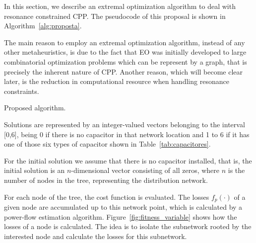 \documentclass[11pt]{article}
\begin{document}
In this section, we describe an extremal optimization algorithm to deal 
with resonance constrained CPP. The pseudocode of this proposal is shown in 
Algorithm~\ref{alg:proposta}.

The main reason to employ an extremal optimization algorithm, instead of any 
other metaheuristics, is due to the fact that EO was initially developed
to large combinatorial optimization problems which can be represent by a graph,
that is precisely the inherent nature of CPP. Another reason, which will become clear later, 
is the reduction in computational resource when handling resonance constraints. 

\begin{algorithm}
        \caption{Proposed algorithm.}
        \label{alg:proposta}
\end{algorithm}

Solutions are represented by an integer-valued vectors belonging to the interval [0,6], 
being 0 if there is no capacitor in that network location and 1 to 6 if it has one
of those six types of capacitor shown in Table~\ref{tab:capacitores}.

For the initial solution we assume that there is no capacitor installed, that is, the initial 
solution is an $n$-dimensional vector consisting of all zeros, where $n$ is the number of nodes in 
the tree, representing the distribution network.

For each node of the tree, the cost function is evaluated. The losses $f_p(\cdot)$ of a given 
node are accumulated up to this network point, which is calculated by a power-flow estimation algorithm.
Figure~\ref{fig:fitness_variable} shows how the losses of a node is calculated. The idea is to isolate the 
subnetwork rooted by the interested node and calculate the losses for this subnetwork.
\end{document}
